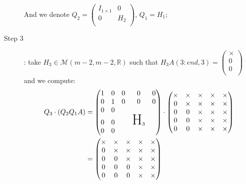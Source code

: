 \documentclass[computationalMathematics.tex]{subfiles}
\begin{document}
\begin{example}
\begin{description}
    And we denote $Q_{2} =\begin{pmatrix}
        I_{1 \times 1} & 0\\
        0 & H_{2}\\
      \end{pmatrix}$, $Q_{1}=H_1$;
  \item[{\sc Step 3}]: take $H_{3} \in \mathcal{M}(m-2, m-2, \mathds{R})$ such that $H_{3}A(3:end, 3) = \begin{pmatrix} \times\\ 0\\ 0\\ \end{pmatrix}$
      and we compute:
      \begin{equation}
        \begin{aligned}
          Q_3 \cdot (Q_2 Q_1 A)
          &=  \begin{pmatrix}
          1 & 0 & 0 & 0 & 0\\
          0 & 1 & 0 & 0 & 0\\
          0 & 0 & & \\
          0 & 0 && \text{\huge H}_3\\
          0 & 0 &&\\
        \end{pmatrix} \cdot  \begin{pmatrix}
          \times & \times & \times & \times & \times\\
          0 & \times & \times & \times & \times\\
          0 & 0 & \times & \times & \times\\
          0 & 0 & \times & \times & \times\\
          0 & 0 & \times & \times & \times\\
        \end{pmatrix}\\
        &= \begin{pmatrix}
          \times & \times & \times & \times & \times\\
          0 & \times & \times & \times & \times\\
          0 & 0 & \times & \times & \times\\
          0 & 0 & 0 & \times & \times\\
          0 & 0 & 0 & \times & \times\\
        \end{pmatrix}
        \end{aligned}
      \end{equation}


\end{description}
\end{example}
\end{document}
